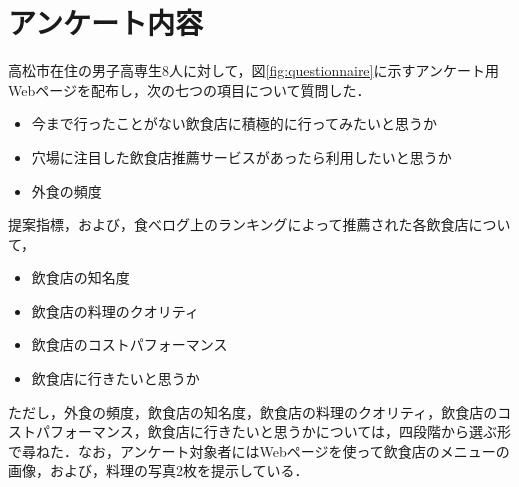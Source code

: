 \section{アンケート内容}\label{exp:questionnaire}

高松市在住の男子高専生8人に対して，図\ref{fig:questionnaire}に示すアンケート用Webページを配布し，次の七つの項目について質問した．
	\begin{itemize}
		\item 今まで行ったことがない飲食店に積極的に行ってみたいと思うか
		\item 穴場に注目した飲食店推薦サービスがあったら利用したいと思うか
		\item 外食の頻度
	\end{itemize}
	提案指標，および，食べログ上のランキングによって推薦された各飲食店について，
	\begin{itemize}
		\item 飲食店の知名度
		\item 飲食店の料理のクオリティ
		\item 飲食店のコストパフォーマンス
		\item 飲食店に行きたいと思うか
	\end{itemize}
	ただし，外食の頻度，飲食店の知名度，飲食店の料理のクオリティ，飲食店のコストパフォーマンス，飲食店に行きたいと思うかについては，四段階から選ぶ形で尋ねた．なお，アンケート対象者にはWebページを使って飲食店のメニューの画像，および，料理の写真2枚を提示している．

